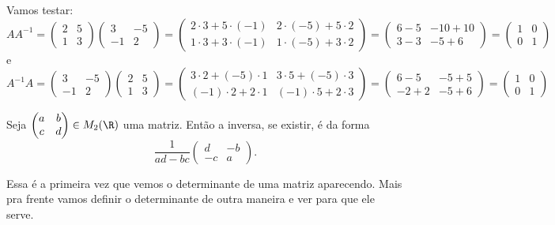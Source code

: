 \begin{ex}
	Vamos testar:
	\[AA^{-1}=\begin{pmatrix}
	2&5\\1&3
	\end{pmatrix}\begin{pmatrix}
	3&-5\\-1&2
	\end{pmatrix}=\begin{pmatrix}
	2\cdot3+5\cdot(-1)&2\cdot(-5)+5\cdot2\\
	1\cdot3+3\cdot(-1)&1\cdot(-5)+3\cdot2
	\end{pmatrix}=\begin{pmatrix}
	6-5 & -10+10\\3-3&-5+6
	\end{pmatrix}=\begin{pmatrix}
	1&0\\0&1
	\end{pmatrix}\]e
	\[A^{-1}A=\begin{pmatrix}
	3&-5\\-1&2
	\end{pmatrix}\begin{pmatrix}
	2&5\\1&3
	\end{pmatrix}=\begin{pmatrix}
	3\cdot2+(-5)\cdot1&3\cdot5+(-5)\cdot3\\
	(-1)\cdot2+2\cdot1&(-1)\cdot5+2\cdot3
	\end{pmatrix}=\begin{pmatrix}
	6-5&-5+5\\
	-2+2&-5+6
	\end{pmatrix}=\begin{pmatrix}
	1&0\\0&1
	\end{pmatrix}\]
\end{ex}

\begin{prop}
	Seja $\begin{pmatrix}
	a&b\\c&d
	\end{pmatrix}\in M_2(\R)$ uma matriz. Então a inversa, se existir, é da forma
	\[\frac{1}{ad-bc}\begin{pmatrix}
	d&-b\\
	-c&a
	\end{pmatrix}.\]
\end{prop}

Essa é a primeira vez que vemos o determinante de uma matriz aparecendo. Mais pra frente vamos definir o determinante de outra maneira e ver para que ele serve.


